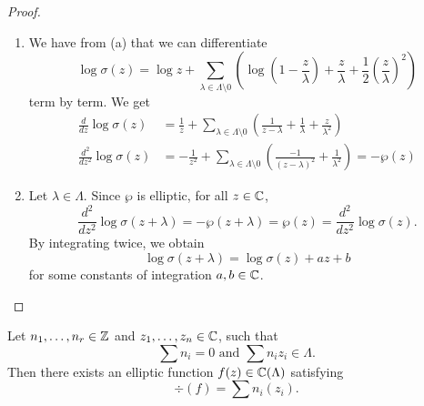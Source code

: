 \begin{proof}
\begin{enumerate}[label=(\alph*)]
		\item We have from (a) that we can differentiate
			\begin{equation*}
				\log \sigma(z) = \log z + 
				\sum_{\lambda \in \Lambda\setminus 0}
				\left(\log\left(1 - \frac{z}{\lambda}\right) +
				\frac{z}{\lambda} + \frac{1}{2}\left(
				\frac{z}{\lambda}\right)^2\right)
			\end{equation*}
			term by term.
			We get
			\begin{align*}
				\frac{d}{dz} \log \sigma(z)
				&= \frac{1}{z} +
				\sum_{\lambda \in \Lambda \setminus 0}
				\left(\frac{1}{z - \lambda}
				+ \frac{1}{\lambda} + \frac{z}{\lambda^2}\right)\\
				\frac{d^2}{dz^2} \log \sigma(z)
				&= -\frac{1}{z^2} + \sum_{\lambda \in \Lambda\setminus 0}
				\left(\frac{-1}{(z - \lambda)^2} + \frac{1}{\lambda^2}\right)
				= -\wp(z)
			\end{align*}

		\item Let $\lambda \in \Lambda$. Since $\wp$ is elliptic,
			for all $z \in \mathbb{C}$,
			\begin{equation*}
				\frac{d^2}{dz^2}\log\sigma(z + \lambda)
				= -\wp(z + \lambda) = \wp(z)
				= \frac{d^2}{dz^2}\log\sigma(z).
			\end{equation*}
			By integrating twice, we obtain
			\begin{equation*}
				\log \sigma(z + \lambda) = \log\sigma(z) + az + b
			\end{equation*}
			for some constants of integration $a, b \in \mathbb{C}$.
	\end{enumerate}
\end{proof}

\begin{proposition}
	\label{prop:complex-divisors}
	Let $n_1, \dots, n_r \in \mathbb{Z}$ and $z_1, \dots, z_n \in \mathbb{C}$, such that
	\begin{equation*}
		\sum n_i = 0 \textrm{ and } \sum n_iz_i \in \Lambda.
	\end{equation*}
	Then there exists an elliptic function $f(z) \in \mathbb{C}(\Lambda)$ satisfying
	\begin{equation*}
		\div(f) = \sum n_i(z_i).
	\end{equation*}
\end{proposition}

